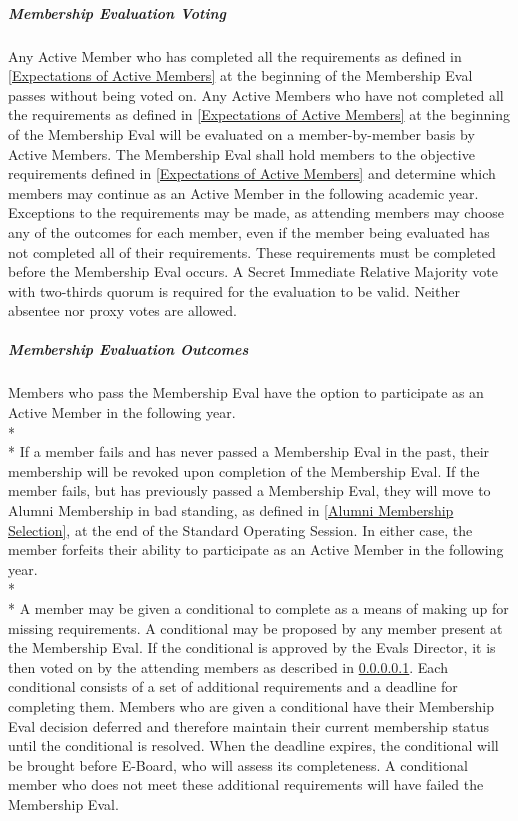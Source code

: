 \documentclass{article}
\newcommand{\asubsubsubsection}[1]{\subparagraph{#1} \label{#1}}
\begin{document}
\asubsubsubsection{Membership Evaluation Voting}
Any Active Member who has completed all the requirements as defined in \ref{Expectations of Active Members} at the beginning of the Membership Eval passes without being voted on.
Any Active Members who have not completed all the requirements as defined in \ref{Expectations of Active Members} at the beginning of the Membership Eval will be evaluated on a member-by-member basis by Active Members.
The Membership Eval shall hold members to the objective requirements defined in \ref{Expectations of Active Members} and determine which members may continue as an Active Member in the following academic year.
Exceptions to the requirements may be made, as attending members may choose any of the outcomes for each member, even if the member being evaluated has not completed all of their requirements.
These requirements must be completed before the Membership Eval occurs.
A Secret Immediate Relative Majority vote with two-thirds quorum is required for the evaluation to be valid.
Neither absentee nor proxy votes are allowed.

\asubsubsubsection{Membership Evaluation Outcomes}
Members who pass the Membership Eval have the option to participate as an Active Member in the following year.
\\* \\*
If a member fails and has never passed a Membership Eval in the past, their membership will be revoked upon completion of the Membership Eval.
If the member fails, but has previously passed a Membership Eval, they will move to Alumni Membership in bad standing, as defined in \ref{Alumni Membership Selection}, at the end of the Standard Operating Session.
In either case, the member forfeits their ability to participate as an Active Member in the following year.
\\* \\*
A member may be given a conditional to complete as a means of making up for missing requirements.
A conditional may be proposed by any member present at the Membership Eval.
If the conditional is approved by the Evals Director, it is then voted on by the attending members as described in \ref{Membership Evaluation Voting}.
Each conditional consists of a set of additional requirements and a deadline for completing them.
Members who are given a conditional have their Membership Eval decision deferred and therefore maintain their current membership status until the conditional is resolved.
When the deadline expires, the conditional will be brought before E-Board, who will assess its completeness.
A conditional member who does not meet these additional requirements will have failed the Membership Eval.
\end{document}
